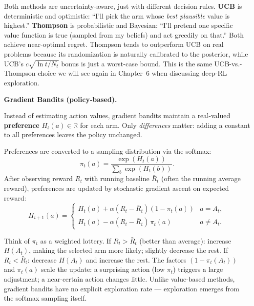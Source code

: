 \documentclass[11pt, oneside]{book}
\newcommand{\R}{\mathbb{R}}
\begin{document}
\begin{intbox}[title={UCB vs.\ Thompson Sampling}]
Both methods are uncertainty-aware, just with different decision rules.
\textbf{UCB} is deterministic and optimistic: ``I'll pick the arm whose \emph{best
plausible} value is highest.''
\textbf{Thompson} is probabilistic and Bayesian: ``I'll pretend one specific value
function is true (sampled from my beliefs) and act greedily on that.''
Both achieve near-optimal regret. Thompson tends to outperform UCB on real problems
because its randomization is naturally calibrated to the posterior, while UCB's
$c\sqrt{\ln t / N_t}$ bonus is just a worst-case bound.
This is the same UCB-vs.-Thompson choice we will see again in Chapter~6 when discussing
deep-RL exploration.
\end{intbox}

\medskip
\textbf{Gradient Bandits (policy-based).}

\begin{defbox}[title={Preference Parameters}]
Instead of estimating action values, gradient bandits maintain a real-valued
\textbf{preference} $H_t(a) \in \R$ for each arm.
Only \emph{differences} matter: adding a constant to all preferences leaves the
policy unchanged.
\end{defbox}

Preferences are converted to a sampling distribution via the softmax:
\[
  \pi_t(a) = \frac{\exp(H_t(a))}{\displaystyle\sum_b \exp(H_t(b))}.
\]
After observing reward $R_t$ with running baseline $\bar{R}_t$ (often the running
average reward), preferences are updated by stochastic gradient ascent on expected
reward:
\[
  H_{t+1}(a) =
  \begin{cases}
    H_t(a) + \alpha(R_t - \bar{R}_t)(1 - \pi_t(a)) & a = A_t, \\[4pt]
    H_t(a) - \alpha(R_t - \bar{R}_t)\,\pi_t(a) & a \ne A_t.
  \end{cases}
\]

\begin{intbox}[title={What the Gradient Update Does}]
Think of $\pi_t$ as a weighted lottery.
If $R_t > \bar{R}_t$ (better than average): increase $H(A_t)$, making the selected
arm more likely; slightly decrease the rest.
If $R_t < \bar{R}_t$: decrease $H(A_t)$ and increase the rest.
The factors $(1-\pi_t(A_t))$ and $\pi_t(a)$ scale the update: a surprising action
(low $\pi_t$) triggers a large adjustment; a near-certain action changes little.
Unlike value-based methods, gradient bandits have no explicit exploration rate ---
exploration emerges from the softmax sampling itself.
\end{intbox}
\end{document}
